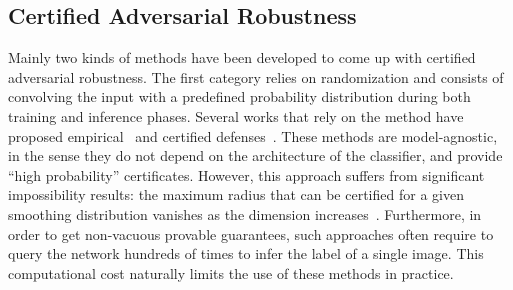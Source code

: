 \subsection{Certified Adversarial Robustness}

Mainly two kinds of methods have been developed to come up with certified adversarial robustness.
The first category relies on randomization and consists of convolving the input with a predefined probability distribution during both training and inference phases.
Several works that rely on the method have proposed empirical~\cite{cao2017mitigating,liu2018towards,pinot2019theoretical,pinot2020randomization} and certified defenses~\cite{lecuyer2018certified,li2019certified,cohen2019certified,salman2019provably,yang2020randomized}. These methods are model-agnostic, in the sense they do not depend on the architecture of the classifier, and provide ``high probability'' certificates.
However, this approach suffers from significant impossibility results: the maximum radius that can be certified for a given smoothing distribution vanishes as the dimension increases~\cite{yang2020randomized}.
Furthermore, in order to get non-vacuous provable guarantees, such approaches often require to query the network hundreds of times to infer the label of a single image.
This computational cost naturally limits the use of these methods in practice.

